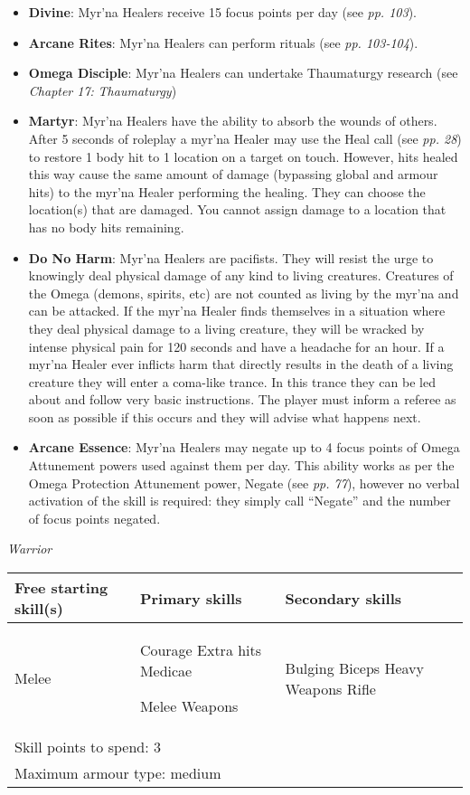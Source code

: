\begin{itemize}
\item \textbf{Divine}: Myr'na Healers receive 15 focus points per day (see \textit{pp. 103}).

\item \textbf{Arcane Rites}: Myr'na Healers can perform rituals (see \textit{pp. 103-104}).

\item \textbf{Omega Disciple}: Myr'na Healers can undertake Thaumaturgy research (see \textit{Chapter 17:} \textit{Thaumaturgy})

\item \textbf{Martyr}: Myr'na Healers have the ability to absorb the wounds of others. After 5 seconds of roleplay a myr'na Healer may use the Heal call (see \textit{pp. 28}) to restore 1 body hit to 1 location on a target on touch. However, hits healed this way cause the same amount of damage (bypassing global and armour hits) to the myr'na Healer performing the healing. They can choose the location(s) that are damaged. You cannot assign damage to a location that has no body hits remaining.

\item \textbf{Do No Harm}: Myr'na Healers are pacifists. They will resist the urge to knowingly deal physical damage of any kind to living creatures. Creatures of the Omega (demons, spirits, etc) are not counted as living by the myr'na and can be attacked. If the myr'na Healer finds themselves in a situation where they deal physical damage to a living creature, they will be wracked by intense physical pain for 120 seconds and have a headache for an hour. If a myr'na Healer ever inflicts harm that directly results in the death of a living creature they will enter a coma-like trance. In this trance they can be led about and follow very basic instructions. The player must inform a referee as soon as possible if this occurs and they will advise what happens next.

\item \textbf{Arcane Essence}: Myr'na Healers may negate up to 4 focus points of Omega Attunement powers used against them per day. This ability works as per the Omega Protection Attunement power, Negate (see \textit{pp. 77}), however no verbal activation of the skill is required: they simply call ``Negate'' and the number of focus points negated.

\end{itemize}
\textit{Warrior}

\begin{table}[H]
\begin{tabular}{|l|l|l|} \hline 
Free starting skill(s) & Primary skills & Secondary skills \\
 \hline Melee & Courage Extra hits Medicae\par Melee Weapons & Bulging Biceps Heavy Weapons Rifle \\
 \hline \multicolumn{3}{|l|}{Skill points to spend: 3} \\
 \hline \multicolumn{3}{|l|}{Maximum armour type: medium} \\
 \hline \end{tabular}

\end{table}

